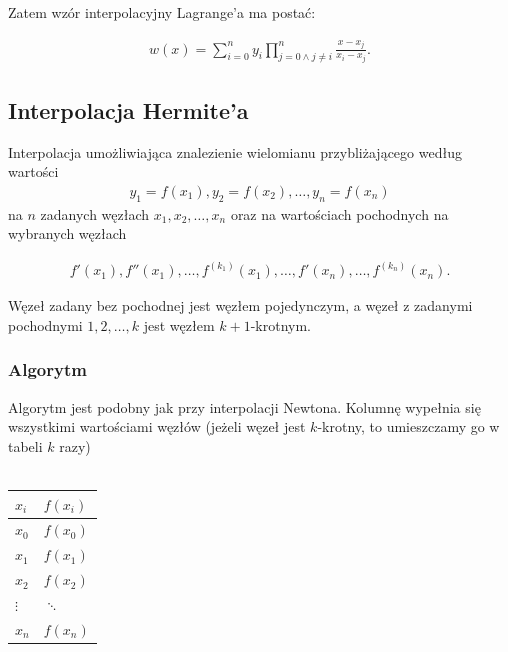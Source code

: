 \documentclass[12pt]{article}
\begin{document}
    Zatem wzór interpolacyjny Lagrange'a ma postać:

    \begin{align*}
        w(x)=\sum _{i=0}^{n}y_{i}\prod _{j=0\land j\neq i}^{n}{\frac {x-x_{j}}{x_{i}-x_{j}}}.
    \end{align*}

    \subsection{Interpolacja Hermite’a}

    Interpolacja umożliwiająca znalezienie wielomianu przybliżającego według wartości
    \begin{align*}
        y_{1}=f(x_{1}),y_{2}=f(x_{2}),\dots ,y_{n}=f(x_{n})
    \end{align*}
    na $n$ zadanych węzłach $x_{1},x_{2},\dots ,x_{n}$ oraz na wartościach pochodnych na wybranych węzłach

    \begin{align*}
        f'(x_{1}),f''(x_{1}),\dots ,f^{(k_{1})}(x_{1}),\dots ,f'(x_{n}),\dots ,f^{(k_{n})}(x_{n}).
    \end{align*}

    Węzeł zadany bez pochodnej jest węzłem pojedynczym, a węzeł z zadanymi pochodnymi $1,2,\dots ,k$ jest węzłem $k+1$-krotnym.

    \subsubsection{Algorytm}

    Algorytm jest podobny jak przy interpolacji Newtona. Kolumnę wypełnia się wszystkimi wartościami węzłów (jeżeli węzeł jest $k$-krotny, to umieszczamy go w tabeli $k$ razy)\\\\
    \begin{tabular}{|l|l|}
        \hline
        $x_i$    & $f(x_i)$ \\ \hline
        $x_0$    & $f(x_0)$ \\ \hline
        $x_1$    & $f(x_1)$ \\ \hline
        $x_2$    & $f(x_2)$ \\ \hline
        $\vdots$ & $\ddots$ \\ \hline
        $x_n$    & $f(x_n)$ \\ \hline
    \end{tabular}
    \\\\
\end{document}

